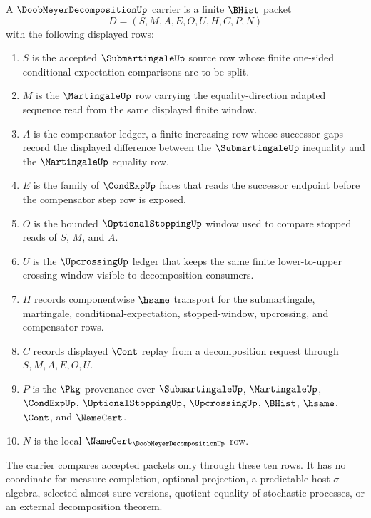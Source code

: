 \begin{definition}
\label{def:doob-meyer-decomposition-carrier}
A $\DoobMeyerDecompositionUp$ carrier is a finite $\BHist$ packet
$$
D=(S,M,A,E,O,U,H,C,P,N)
$$
with the following displayed rows:
\begin{enumerate}
\item $S$ is the accepted $\SubmartingaleUp$ source row whose finite one-sided conditional-expectation comparisons are to be split.
\item $M$ is the $\MartingaleUp$ row carrying the equality-direction adapted sequence read from the same displayed finite window.
\item $A$ is the compensator ledger, a finite increasing row whose successor gaps record the displayed difference between the $\SubmartingaleUp$ inequality and the $\MartingaleUp$ equality row.
\item $E$ is the family of $\CondExpUp$ faces that reads the successor endpoint before the compensator step row is exposed.
\item $O$ is the bounded $\OptionalStoppingUp$ window used to compare stopped reads of $S$, $M$, and $A$.
\item $U$ is the $\UpcrossingUp$ ledger that keeps the same finite lower-to-upper crossing window visible to decomposition consumers.
\item $H$ records componentwise $\hsame$ transport for the submartingale, martingale, conditional-expectation, stopped-window, upcrossing, and compensator rows.
\item $C$ records displayed $\Cont$ replay from a decomposition request through $S,M,A,E,O,U$.
\item $P$ is the $\Pkg$ provenance over $\SubmartingaleUp$, $\MartingaleUp$, $\CondExpUp$, $\OptionalStoppingUp$, $\UpcrossingUp$, $\BHist$, $\hsame$, $\Cont$, and $\NameCert$.
\item $N$ is the local $\NameCert_{\DoobMeyerDecompositionUp}$ row.
\end{enumerate}
The carrier compares accepted packets only through these ten rows. It has no coordinate for measure completion, optional projection, a predictable host $\sigma$-algebra, selected almost-sure versions, quotient equality of stochastic processes, or an external decomposition theorem.
\end{definition}


